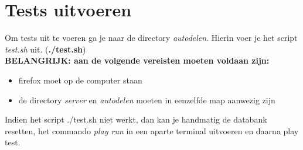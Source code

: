 \documentclass[11pt,a4paper,oneside]{article}
\begin{document}
\section{Tests uitvoeren}\label{sec:junit}
Om tests uit te voeren ga je naar de directory \emph{autodelen}. Hierin voer je het script \emph{test.sh} uit. (\textbf{./test.sh}) \\
\textbf{BELANGRIJK: aan de volgende vereisten moeten voldaan zijn:} 
\begin{itemize}
\item	firefox moet op de computer staan
\item	de directory \emph{server} en \emph{autodelen} moeten in eenzelfde map aanwezig zijn
\end{itemize} 
Indien het script ./test.sh niet werkt, dan kan je handmatig de databank resetten, het commando \emph{play run} in een aparte terminal uitvoeren en daarna play test.
\end{document}
